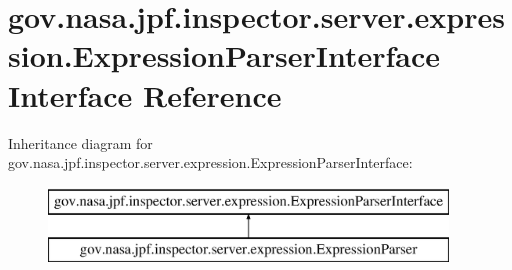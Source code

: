 \hypertarget{interfacegov_1_1nasa_1_1jpf_1_1inspector_1_1server_1_1expression_1_1_expression_parser_interface}{}\section{gov.\+nasa.\+jpf.\+inspector.\+server.\+expression.\+Expression\+Parser\+Interface Interface Reference}
\label{interfacegov_1_1nasa_1_1jpf_1_1inspector_1_1server_1_1expression_1_1_expression_parser_interface}
Inheritance diagram for gov.\+nasa.\+jpf.\+inspector.\+server.\+expression.\+Expression\+Parser\+Interface\+:\begin{figure}[H]
\begin{center}
\leavevmode
\includegraphics[height=2.000000cm]{interfacegov_1_1nasa_1_1jpf_1_1inspector_1_1server_1_1expression_1_1_expression_parser_interface}
\end{center}
\end{figure}
